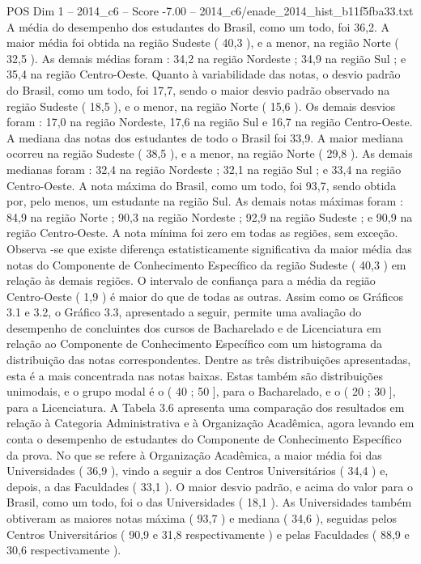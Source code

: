 \begin{textsample}{POS Dim 1 – 2014\_c6 – Score -7.00 – 2014\_c6/enade\_2014\_hist\_b11f5fba33.txt}
A média do desempenho dos estudantes do Brasil, como um todo, foi 36,2.
A maior média foi obtida na região Sudeste ( 40,3 ), e a menor, na região Norte ( 32,5 ).
As demais médias foram : 34,2 na região Nordeste ; 34,9 na região Sul ; e 35,4 na região Centro-Oeste.
Quanto à variabilidade das notas, o desvio padrão do Brasil, como um todo, foi 17,7, sendo o maior desvio padrão observado na região Sudeste ( 18,5 ), e o menor, na região Norte ( 15,6 ).
Os demais desvios foram : 17,0 na região Nordeste, 17,6 na região Sul e 16,7 na região Centro-Oeste.
A mediana das notas dos estudantes de todo o Brasil foi 33,9.
A maior mediana ocorreu na região Sudeste ( 38,5 ), e a menor, na região Norte ( 29,8 ).
As demais medianas foram : 32,4 na região Nordeste ; 32,1 na região Sul ; e 33,4 na região Centro-Oeste.
A nota máxima do Brasil, como um todo, foi 93,7, sendo obtida por, pelo menos, um estudante na região Sul.
As demais notas máximas foram : 84,9 na região Norte ; 90,3 na região Nordeste ; 92,9 na região Sudeste ; e 90,9 na região Centro-Oeste.
A nota mínima foi zero em todas as regiões, sem exceção.
Observa -se que existe diferença estatisticamente significativa da maior média das notas do Componente de Conhecimento Específico da região Sudeste ( 40,3 ) em relação às demais regiões.
O intervalo de confiança para a média da região Centro-Oeste ( 1,9 ) é maior do que de todas as outras.
Assim como os Gráficos 3.1 e 3.2, o Gráfico 3.3, apresentado a seguir, permite uma avaliação do desempenho de concluintes dos cursos de Bacharelado e de Licenciatura em relação ao Componente de Conhecimento Específico com um histograma da distribuição das notas correspondentes.
Dentre as três distribuições apresentadas, esta é a mais concentrada nas notas baixas.
Estas também são distribuições unimodais, e o grupo modal é o ( 40 ; 50 ], para o Bacharelado, e o ( 20 ; 30 ], para a Licenciatura.
A Tabela 3.6 apresenta uma comparação dos resultados em relação à Categoria Administrativa e à Organização Acadêmica, agora levando em conta o desempenho de estudantes do Componente de Conhecimento Específico da prova.
No que se refere à Organização Acadêmica, a maior média foi das Universidades ( 36,9 ), vindo a seguir a dos Centros Universitários ( 34,4 ) e, depois, a das Faculdades ( 33,1 ).
O maior desvio padrão, e acima do valor para o Brasil, como um todo, foi o das Universidades ( 18,1 ).
As Universidades também obtiveram as maiores notas máxima ( 93,7 ) e mediana ( 34,6 ), seguidas pelos Centros Universitários ( 90,9 e 31,8 respectivamente ) e pelas Faculdades ( 88,9 e 30,6 respectivamente ).

\end{textsample}
